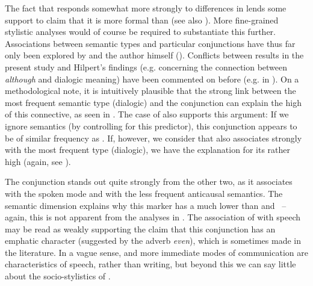 The fact that  responds somewhat more strongly to differences in  lends some support to   claim that it is more formal than  (see also \citealt{BiberEtAl1999,HuddlestonPullum2002,Aarts1988}). More fine-grained stylistic analyses would of course be required to substantiate this further. Associations between semantic types and particular conjunctions have thus far only been explored by \citet{Hilpert2013a} and the author himself (\citealt{Schützler2017,Schützler2018b}). Conflicts between results in the present study and Hilpert’s findings (e.g. concerning the connection between \textit{although} and dialogic meaning) have been commented on before (e.g. in ). On a methodological note, it is intuitively plausible that the strong link between the most frequent semantic type (dialogic) and the conjunction  can explain the high  of this connective, as seen in . The case of  also supports this argument: If we ignore semantics (by controlling for this predictor), this conjunction appears to be of similar frequency as . If, however, we consider that  also associates strongly with the most frequent type (dialogic), we have the explanation for its rather high  (again, see ).

The conjunction  stands out quite strongly from the other two, as it associates with the spoken mode and with the less frequent anticausal semantics. The semantic dimension explains why this marker has a much lower  than  and ~– again, this is not apparent from the analyses in . The association of  with speech may be read as weakly supporting the claim that this conjunction has an emphatic character (suggested by the adverb \textit{even}), which is sometimes made in the literature. In a vague sense,  and more immediate modes of communication are characteristics of speech, rather than writing, but beyond this we can say little about the socio-stylistics of .

